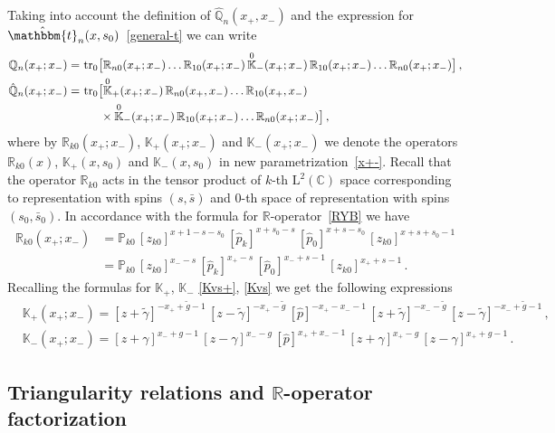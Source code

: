 \documentclass[a4paper,11pt]{article}
\newcommand{\tr}{\mathop{\rm tr}\nolimits}
\numberwithin{equation}{section}
\begin{document}
Taking into account the definition of $\hat{\mathbb{Q}}_n(x_+,x_-)$ and the expression for $\hat{\mathbbm{t}}_n(x,s_0)$~\eqref{general-t} we can write
\begin{align}
	\nonumber
	\mathbb{Q}_n(x_+;x_-) = \, & \tr_0\bigl[\mathbb{R}_{n0}(x_+;x_-)\dots\mathbb{R}_{10}(x_+;x_-)\,\overset{0}{\mathbb{K}}_-(x_+;x_-)\,\mathbb{R}_{10}(x_+;x_-)\dots\mathbb{R}_{n0}(x_+;x_-)\bigr] \,, \\
	\nonumber
	\hat{\mathbb{Q}}_n(x_+;x_-) = \, & \tr_0\bigl[\overset{0}{\mathbb{K}}_+(x_+;x_-)\,\mathbb{R}_{n0}(x_+,x_-)\dots\mathbb{R}_{10}(x_+,x_-) \\
	& \nonumber
	\quad\;\;\times \overset{0}{\mathbb{K}}_-(x_+;x_-)\,\mathbb{R}_{10}(x_+;x_-)\dots\mathbb{R}_{n0}(x_+;x_-)\bigr] \,,
\end{align}
where by $\mathbb{R}_{k0}(x_+;x_-)$, $\mathbb{K}_+(x_+;x_-)$ and $\mathbb{K}_-(x_+;x_-)$ we denote the operators $\mathbb{R}_{k0}(x)$, $\mathbb{K}_+(x,s_0)$ and $\mathbb{K}_-(x,s_0)$ in new parametrization~\eqref{x+-}.
Recall that the operator $\mathbb{R}_{k0}$ acts in the tensor product of $k$-th $\mathrm{L}^2(\mathbb{C})$ space corresponding to representation with spins $(s,\bar{s})$ and $0$-th space of representation with spins $(s_0,\bar{s}_0)$.
In accordance with the formula for $\mathbb{R}$-operator~\eqref{RYB} we have
\begin{align}
	\nonumber
	\mathbb{R}_{k0}(x_+;x_-)
	& =
	\mathbb{P}_{k0}\,[z_{k0}]^{x+1-s-s_0}\,
	[\hat{p}_k]^{x+s_0-s}\,[\hat{p}_0]^{x+s-s_0}\,
	[z_{k0}]^{x+s+s_0-1} \\
	\label{Rx+-}
	& =
	\mathbb{P}_{k0}\,[z_{k0}]^{x_--s}\,
	[\hat{p}_k]^{x_+-s}\,[\hat{p}_0]^{x_-+s-1}\,
	[z_{k0}]^{x_++s-1} \,.
\end{align}
Recalling the formulas for $\mathbb{K}_+$, $\mathbb{K}_-$ \eqref{Kvs+}, \eqref{Kvs} we get the following expressions
\begin{align}
	& \label{K+x+-}
	\mathbb{K}_+(x_+;x_-) =
	[z+\tilde{\gamma}]^{-x_++\tilde{g}-1} \,
	[z-\tilde{\gamma}]^{-x_+-\tilde{g}} \,
	[\hat{p}]^{-x_+-x_--1} \,
	[z+\tilde{\gamma}]^{-x_--\tilde{g}} \,
	[z-\tilde{\gamma}]^{-x_-+\tilde{g}-1} \,, \\
	& \label{K-x+-}
	\mathbb{K}_-(x_+;x_-) =
	[z+\gamma]^{x_-+g-1} \,
	[z-\gamma]^{x_--g} \,
	[\hat{p}]^{x_++x_--1} \,
	[z+\gamma]^{x_+-g} \,
	[z-\gamma]^{x_++g-1} \,.
\end{align}


\subsection{Triangularity relations and $\mathbb{R}$-operator factorization}
\end{document}
